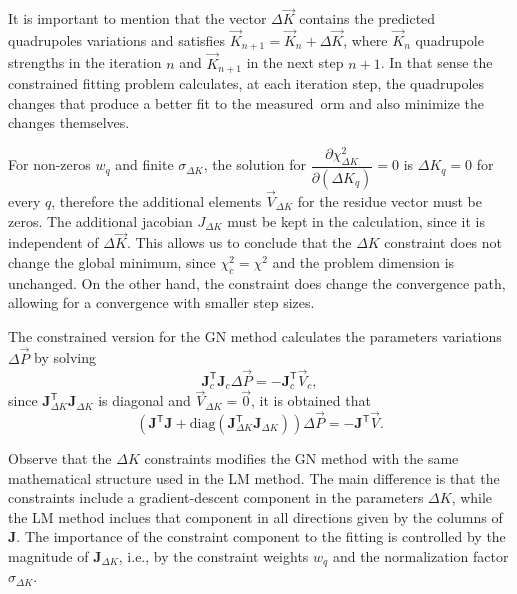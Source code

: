 It is important to mention that the vector $\Delta \vec{K}$ contains the predicted quadrupoles variations and satisfies $\vec{K}_{n+1} = \vec{K}_n + \Delta \vec{K}$, where $\vec{K}_n$ quadrupole strengths in the iteration $n$ and $\vec{K}_{n+1}$ in the next step $n+1$. In that sense the constrained fitting problem calculates, at each iteration step, the quadrupoles changes that produce a better fit to the measured~\gls{orm} and also minimize the changes themselves. 

For non-zeros $w_q$ and finite $\sigma_{\Delta K}$, the solution for $\dfrac{\partial \chi^2_{\Delta K}}{\partial \left(\Delta K_q\right)} = 0$ is $\Delta K_q = 0$ for every $q$, therefore the additional elements $\vec{V}_{\Delta K}$ for the residue vector must be zeros. The additional jacobian $J_{\Delta K}$ must be kept in the calculation, since it is independent of $\Delta \vec{K}$. This allows us to conclude that the $\Delta K$ constraint does not change the global minimum, since $\chi^2_c = \chi^2$ and the problem dimension is unchanged. On the other hand, the constraint does change the convergence path, allowing for a convergence with smaller step sizes.

The constrained version for the GN method calculates the parameters variations $\Delta \vec{P}$ by solving
\begin{equation}
\mathbf{J}^{\mathsf{T}}_c\mathbf{J}_c\Delta \vec{P} = - \mathbf{J}^{\mathsf{T}}_c\vec{V}_c,
\end{equation}
since $\mathbf{J}^{\mathsf{T}}_{\Delta K}\mathbf{J}_{\Delta K}$ is diagonal and $\vec{V}_{\Delta K} = \vec{0}$, it is obtained that
\begin{equation}
    \left(\mathbf{J}^{\mathsf{T}}\mathbf{J}  + \mathrm{diag}\left(\mathbf{J}^{\mathsf{T}}_{\Delta K}\mathbf{J}_{\Delta K}\right) \right)\Delta \vec{P} =  - \mathbf{J}^{\mathsf{T}}\vec{V}.
    \label{eq:gn_modified}
\end{equation}

Observe that the $\Delta K$ constraints modifies the GN method with the same mathematical structure used in the LM method. The main difference is that the constraints include a gradient-descent component in the parameters $\Delta K$, while the LM method inclues that component in all directions given by the columns of $\mathbf{J}$. The importance of the constraint component to the fitting is controlled by the magnitude of $\mathbf{J}_{\Delta K}$, i.e., by the constraint weights $w_q$ and the normalization factor $\sigma_{\Delta K}$. 

